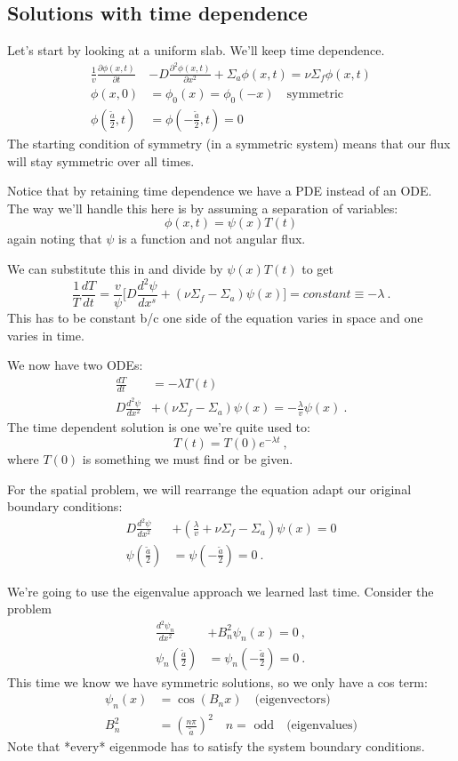 \documentclass[12pt]{article}
\begin{document}
\subsection*{Solutions with time dependence}
Let's start by looking at a uniform slab. We'll keep time dependence.
\begin{align*}
\frac{1}{v} \frac{\partial \phi(x, t)}{\partial t}& - D \frac{\partial ^2 \phi(x, t)}{\partial x^2} + \Sigma_a \phi(x, t) = \nu\Sigma_f \phi(x, t) \\
\phi(x,0) &= \phi_0(x) = \phi_0(-x) \quad \text{symmetric}\\
\phi(\frac{\tilde{a}}{2}, t) &= \phi(-\frac{\tilde{a}}{2}, t) = 0
\end{align*}
The starting condition of symmetry (in a symmetric system) means that our flux will stay symmetric over all times.

Notice that by retaining time dependence we have a PDE instead of an ODE. The way we'll handle this here is by assuming a separation of variables:
\[
\phi(x,t) = \psi(x) T(t)
\]
again noting that $\psi$ is a function and not angular flux.

We can substitute this in and divide by $\psi(x) T(t)$ to get
\[
\frac{1}{T}\frac{dT}{dt} = \frac{v}{\psi}\bigl[ D\frac{d^2 \psi}{dx^s} + (\nu \Sigma_f - \Sigma_a) \psi(x) \bigr] = constant \equiv -\lambda \:.
\]
This has to be constant b/c one side of the equation varies in space and one varies in time. 

We now have two ODEs:
\begin{align*}
\frac{dT}{dt} &= -\lambda T(t) \\
D\frac{d^2 \psi}{dx^2} &+ (\nu \Sigma_f - \Sigma_a) \psi(x) = -\frac{\lambda}{v} \psi(x) \:.
\end{align*}
The time dependent solution is one we're quite used to:
\[
T(t) = T(0) e^{-\lambda t}\:,
\]
where $T(0)$ is something we must find or be given.

For the spatial problem, we will rearrange the equation adapt our original boundary conditions:
\begin{align*}
D\frac{d^2 \psi}{dx^2} &+ (\frac{\lambda}{v} + \nu \Sigma_f - \Sigma_a) \psi(x) = 0 \\
\psi(\frac{\tilde{a}}{2}) &= \psi(-\frac{\tilde{a}}{2}) = 0\:.
\end{align*}

We're going to use the eigenvalue approach we learned last time. Consider the problem
\begin{align*}
\frac{d^2 \psi_n}{dx^2} &+ B_n^2 \psi_n(x) = 0 \:,\\
\psi_n(\frac{\tilde{a}}{2}) &= \psi_n(-\frac{\tilde{a}}{2}) = 0\:.
\end{align*}
This time we know we have symmetric solutions, so we only have a cos term:
\begin{align*}
\psi_n(x) &= \cos(B_n x) \quad \text{(eigenvectors)}\\
B_n^2 &= (\frac{n\pi}{\tilde{a}})^2 \quad n = \text{ odd} \quad \text{(eigenvalues)}
\end{align*}
Note that *every* eigenmode has to satisfy the system boundary conditions. 
\end{document}
